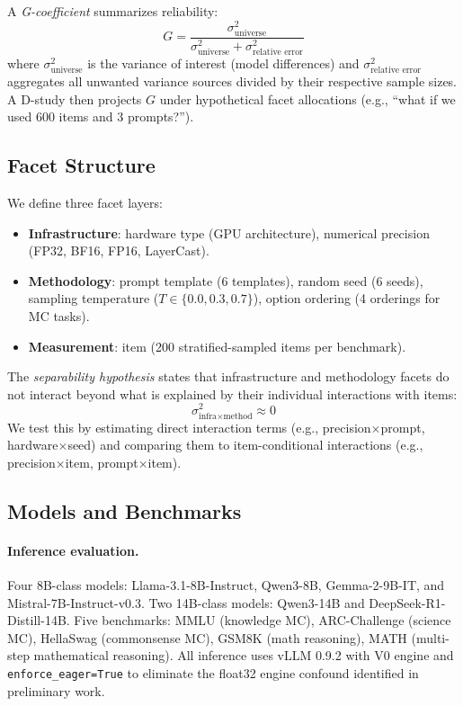 \documentclass[11pt]{article}
\newcommand{\gcoeff}{G}
\begin{document}
A \emph{G-coefficient} summarizes reliability:
\begin{equation}
\gcoeff = \frac{\sigma^2_{\text{universe}}}{\sigma^2_{\text{universe}} + \sigma^2_{\text{relative error}}}
\end{equation}
where $\sigma^2_{\text{universe}}$ is the variance of interest (model differences) and $\sigma^2_{\text{relative error}}$ aggregates all unwanted variance sources divided by their respective sample sizes.
A D-study then projects $\gcoeff$ under hypothetical facet allocations (e.g., ``what if we used 600 items and 3 prompts?'').

\subsection{Facet Structure}

We define three facet layers:
\begin{itemize}
    \item \textbf{Infrastructure}: hardware type (GPU architecture), numerical precision (FP32, BF16, FP16, LayerCast).
    \item \textbf{Methodology}: prompt template (6 templates), random seed (6 seeds), sampling temperature ($T \in \{0.0, 0.3, 0.7\}$), option ordering (4 orderings for MC tasks).
    \item \textbf{Measurement}: item (200 stratified-sampled items per benchmark).
\end{itemize}

The \emph{separability hypothesis} states that infrastructure and methodology facets do not interact beyond what is explained by their individual interactions with items:
\begin{equation}
\sigma^2_{\text{infra} \times \text{method}} \approx 0
\end{equation}
We test this by estimating direct interaction terms (e.g., precision$\times$prompt, hardware$\times$seed) and comparing them to item-conditional interactions (e.g., precision$\times$item, prompt$\times$item).

\subsection{Models and Benchmarks}

\paragraph{Inference evaluation.}
Four 8B-class models: Llama-3.1-8B-Instruct, Qwen3-8B, Gemma-2-9B-IT, and Mistral-7B-Instruct-v0.3.
Two 14B-class models: Qwen3-14B and DeepSeek-R1-Distill-14B.
Five benchmarks: MMLU (knowledge MC), ARC-Challenge (science MC), HellaSwag (commonsense MC), GSM8K (math reasoning), MATH (multi-step mathematical reasoning).
All inference uses vLLM 0.9.2 with V0 engine and \texttt{enforce\_eager=True} to eliminate the float32 engine confound identified in preliminary work.
\end{document}
